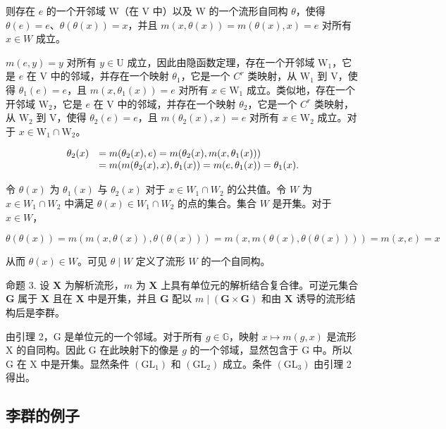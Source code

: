则存在 \(e\) 的一个开邻域 W（在 V 中）以及 W 的一个流形自同构 \(\theta\)，使得 \(\theta(e) = e\)、\(\theta(\theta(x)) = x\)，并且 \(m(x, \theta(x)) = m(\theta(x), x) = e\) 对所有 \(x \in W\) 成立。

\(m(e,y) = y\) 对所有 \(y \in \mathrm{U}\) 成立，因此由隐函数定理，存在一个开邻域 \(\mathrm{W}_1\)，它是 \(e\) 在 \(\mathrm{V}\) 中的邻域，并存在一个映射 \(\theta_1\)，它是一个 \(C^r\) 类映射，从 \(\mathrm{W}_1\) 到 \(\mathrm{V}\)，使得 \(\theta_1(e) = e\)，且 \(m(x,\theta_1(x)) = e\) 对所有 \(x \in \mathrm{W}_1\) 成立。类似地，存在一个开邻域 \(\mathrm{W}_2\)，它是 \(e\) 在 \(\mathrm{V}\) 中的邻域，并存在一个映射 \(\theta_2\)，它是一个 \(C^r\) 类映射，从 \(\mathrm{W}_2\) 到 \(\mathrm{V}\)，使得 \(\theta_2(e) = e\)，且 \(m(\theta_2(x),x) = e\) 对所有 \(x \in \mathrm{W}_2\) 成立。对于 \(x \in \mathrm{W}_1 \cap \mathrm{W}_2\)。

\[
\begin{array}{r l} \theta_ {2} (x) & = m (\theta_ {2} (x), e) = m (\theta_ {2} (x), m (x, \theta_ {1} (x))) \\ & = m (m (\theta_ {2} (x), x), \theta_ {1} (x)) = m (e, \theta_ {1} (x)) = \theta_ {1} (x). \end{array}
\]

令 \(\theta(x)\) 为 \(\theta_1(x)\) 与 \(\theta_2(x)\) 对于 \(x \in W_1 \cap W_2\) 的公共值。令 \(W\) 为 \(x \in W_1 \cap W_2\) 中满足 \(\theta(x) \in W_1 \cap W_2\) 的点的集合。集合 \(W\) 是开集。对于 \(x \in W\)，

\[
\theta (\theta (x)) = m (m (x, \theta (x)), \theta (\theta (x))) = m (x, m (\theta (x), \theta (\theta (x)))) = m (x, e) = x
\]

从而 \(\theta(x) \in W\)。可见 \(\theta \mid W\) 定义了流形 \(W\) 的一个自同构。

命题 3. 设 \(\mathbf{X}\) 为解析流形，\(m\) 为 \(\mathbf{X}\) 上具有单位元的解析结合复合律。可逆元集合 \(\mathbf{G}\) 属于 \(\mathbf{X}\) 且在 \(\mathbf{X}\) 中是开集，并且 \(\mathbf{G}\) 配以 \(m \mid (\mathbf{G} \times \mathbf{G})\) 和由 \(\mathbf{X}\) 诱导的流形结构后是李群。

由引理 2，G 是单位元的一个邻域。对于所有 \(g \in \mathbb{G}\)，映射 \(x \mapsto m(g, x)\) 是流形 X 的自同构。因此 G 在此映射下的像是 \(g\) 的一个邻域，显然包含于 G 中。所以 G 在 X 中是开集。显然条件 \((\mathrm{GL}_1)\) 和 \((\mathrm{GL}_2)\) 成立。条件 \((\mathrm{GL}_3)\) 由引理 2 得出。

\subsection*{李群的例子}

